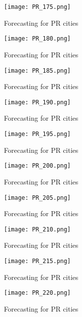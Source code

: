  \begin{figure}[!ht] 
 \centering 
 \texttt{[image: PR\_175.png]} 
 \caption{Forecasting for PR cities } 
 \label{fig:PR_175} 
 \end{figure} 
 
 \begin{figure}[!ht] 
 \centering 
 \texttt{[image: PR\_180.png]} 
 \caption{Forecasting for PR cities } 
 \label{fig:PR_180} 
 \end{figure} 
 
 \begin{figure}[!ht] 
 \centering 
 \texttt{[image: PR\_185.png]} 
 \caption{Forecasting for PR cities } 
 \label{fig:PR_185} 
 \end{figure} 
 
 \begin{figure}[!ht] 
 \centering 
 \texttt{[image: PR\_190.png]} 
 \caption{Forecasting for PR cities } 
 \label{fig:PR_190} 
 \end{figure} 
 
 \begin{figure}[!ht] 
 \centering 
 \texttt{[image: PR\_195.png]} 
 \caption{Forecasting for PR cities } 
 \label{fig:PR_195} 
 \end{figure} 
 
 \begin{figure}[!ht] 
 \centering 
 \texttt{[image: PR\_200.png]} 
 \caption{Forecasting for PR cities } 
 \label{fig:PR_200} 
 \end{figure} 
 
 \begin{figure}[!ht] 
 \centering 
 \texttt{[image: PR\_205.png]} 
 \caption{Forecasting for PR cities } 
 \label{fig:PR_205} 
 \end{figure} 
 
 \begin{figure}[!ht] 
 \centering 
 \texttt{[image: PR\_210.png]} 
 \caption{Forecasting for PR cities } 
 \label{fig:PR_210} 
 \end{figure} 
 
 \begin{figure}[!ht] 
 \centering 
 \texttt{[image: PR\_215.png]} 
 \caption{Forecasting for PR cities } 
 \label{fig:PR_215} 
 \end{figure} 
 
 \begin{figure}[!ht] 
 \centering 
 \texttt{[image: PR\_220.png]} 
 \caption{Forecasting for PR cities } 
 \label{fig:PR_220} 
 \end{figure} 
 
